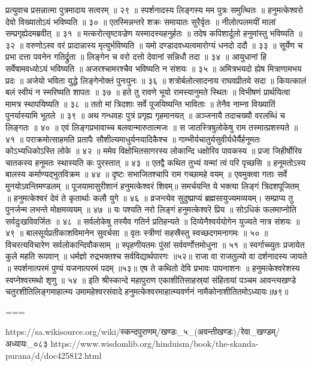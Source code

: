 प्रत्युवाच प्रसन्नात्मा पुत्रमादाय सत्वरम् ॥ २९ ॥
स्पर्शनादस्य लिङ्गस्य मम पुत्रः समुत्थितः ॥
हनुमत्केश्वरो देवो विख्यातोऽयं भविष्यति ॥ ३० ॥
एतस्मिन्नन्तरे शक्रः समायातः सुरैर्वृतः ॥
नीलोत्पलमयीं मालां सम्प्रगृह्येदमब्रवीत् ॥ ३१ ॥
मत्करोत्सृष्टवज्रेण यस्मादस्यहनुर्हतः ॥
तदेष कपिशार्दूलो हनुमांस्तु भविष्यति ॥ ३२ ॥
वरुणोऽस्व वरं प्रादान्नास्य मृत्युर्भविष्यति ॥
यमो दण्डादवध्यत्वमारोग्यं धनदो ददौ ॥ ३३ ॥
सूर्येण च प्रभा दत्ता पवनेन गतिर्द्रुता ॥
लिङ्गेन च वरो दत्तो देवानां सन्निधौ तदा ॥ ३४ ॥
आयुधानां हि सर्वेषामवध्योऽयं भविष्यति ॥
अजरश्चामरश्चैव भविष्यति न संशयः ॥ ३५ ॥
अमित्रभयदो ह्येष मित्राणामभय प्रदः ॥
अजेयो भविता युद्धे लिङ्गेनोक्तं पुनःपुनः ॥ ३६ ॥
शत्रोर्बलोत्सादनाय राघवप्रीतये सदा ॥
कियत्कालं बलं स्वीयं न स्मरिष्यति शापतः ॥ ३७ ॥
हते तु रावणे भूयो रामस्यानुमते स्थितः ॥
विभीषणं प्रार्थयित्वा मामत्र स्थापयिष्यति ॥ ३८ ॥
ततो मां त्रिदशाः सर्वे पूजयिष्यन्ति भाविताः ॥
तेनैव नाम्ना विख्यातिं पुनर्यास्यामि भूतले ॥ ३९ ॥
अथ गन्धवहः पुत्रं प्रगृह्य गृहमानयत् ॥
अञ्जनायै तदाचख्यौ वरलब्धिं च लिङ्गतः ॥ ४० ॥
एवं लिङ्गप्रभावाच्च बलवान्मारुतात्मजः ॥
स जातस्त्रिषुलोकेषु राम तस्मात्प्रशस्यते ॥ ४१ ॥
पराक्रमोत्साहमति प्रतापैः सौशील्यमाधुर्यनयादिकैश्च ॥
गाम्भीर्यचातुर्यसुवीर्यधैर्यैर्हनूमतः कोऽभ्यधिकोऽस्ति लोके ॥ ४२ ॥
ममेव विक्षोभितसागरस्य लोकान्दि धक्षोरिव पावकस्य ॥
प्रजा जिहीर्षोरिव चातकस्य हनूमतः स्थास्यति कः पुरस्तात् ॥ ४३ ॥
एतद्वै कथित तुभ्यं यन्मां त्वं परि पृच्छसि ॥
हनूमतोऽस्य बालस्य कर्माण्यद्भुतविक्रम ॥ ४४ ॥
दृष्टः सभाजितश्चापि राम गच्छामहे वयम् ॥
एवमुक्त्वा गताः सर्वे मुनयोऽवन्तिमण्डलम् ॥
पूजयामासुरीशानं हनुमत्केश्वरं शिवम्॥
समर्चयन्ति ये भक्त्या लिङ्गं त्रिदशपूजितम् ॥
हनुमत्केश्वरं देवं ते कृतार्थाः कलौ युगे ॥ ४६ ॥
व्रजन्त्येव सुदुष्प्राप्यं ब्रह्मसायुज्यमव्ययम्।
सम्प्राप्य तु पुनर्जन्म लभन्ते मोक्षमव्ययम् ॥ ४७ ॥
यः पश्यति नरो लिङ्गं हनुमत्केश्वरॆ प्रिय ॥
सोऽधिकं फलमाप्नोति सर्वदुःखविवर्जितः ॥ ४८ ॥
सर्वलोकेषु तस्यैव गतिर्न प्रतिहन्यते ॥
दिव्येनैश्वर्ययोगेन युज्यते नात्र संशयः ॥ ४९ ॥
बालसूर्यप्रतीकाशविमानेन सुवर्चसा ॥
वृतः स्त्रीणां सहस्रैस्तु स्वच्छदगमनागमः ॥ ५० ॥
विचरत्यविचारेण सर्वलोकान्दिवौकसाम् ॥
स्पृहणीयतमः पुंसां सर्ववर्णोत्तमोधुना ॥ ५१ ॥
स्वर्गाच्च्युतः प्रजायेत कुले महति रूपवान् ॥
धर्मज्ञो रुद्रभक्तश्च सर्वविद्यार्थपारगः ॥५२॥
राजा वा राजतुल्यो वा दर्शनादस्य जायते ॥
स्पर्शनात्परमं पुण्यं यजनात्परमं पदम् ॥५३॥
एष ते कथितो देवि प्रभावः पापनाशनः ॥
हनुमत्केश्वरेशस्य स्वप्नेश्वरमथो शृणु ॥ ५४ ॥
इति श्रीस्कान्दे महापुराण एकाशीतिसाहस्र्यां संहितायां पञ्चम आवन्त्यखण्डे चतुरशीतिलिङ्गमाहात्म्य उमामहेश्वरसंवादे हनुमत्केश्वरमाहात्म्यवर्णनं नामैकोनाशीतितमोऽध्यायः॥७९॥

===

https://sa.wikisource.org/wiki/स्कन्दपुराणम्/खण्डः_५_(अवन्तीखण्डः)/रेवा_खण्डम्/अध्यायः_०८३
https://www.wisdomlib.org/hinduism/book/the-skanda-purana/d/doc425812.html

